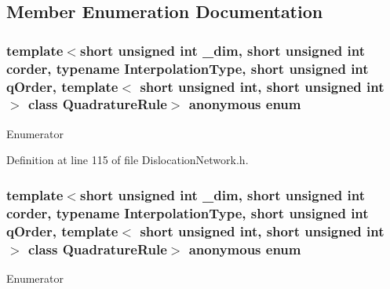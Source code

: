 \subsection{Member Enumeration Documentation}
\hypertarget{classmodel_1_1_dislocation_network_acc72ad5cadfe616bf9a84a64c77a4194}{}\subsubsection[{anonymous enum}]{\setlength{\rightskip}{0pt plus 5cm}template$<$short unsigned int \+\_\+dim, short unsigned int corder, typename Interpolation\+Type, short unsigned int q\+Order, template$<$ short unsigned int, short unsigned int $>$ class Quadrature\+Rule$>$ anonymous enum}\label{classmodel_1_1_dislocation_network_acc72ad5cadfe616bf9a84a64c77a4194}
\begin{Desc}
\item[Enumerator]\par
\begin{description}
\item[{\em 
\hypertarget{classmodel_1_1_dislocation_network_acc72ad5cadfe616bf9a84a64c77a4194aa094f91064b6826bd0d38c0a82dd5196}{}dim\label{classmodel_1_1_dislocation_network_acc72ad5cadfe616bf9a84a64c77a4194aa094f91064b6826bd0d38c0a82dd5196}
}]\end{description}
\end{Desc}


Definition at line 115 of file Dislocation\+Network.\+h.

\hypertarget{classmodel_1_1_dislocation_network_aaca8a960ed677d30699d7473fa964b40}{}\subsubsection[{anonymous enum}]{\setlength{\rightskip}{0pt plus 5cm}template$<$short unsigned int \+\_\+dim, short unsigned int corder, typename Interpolation\+Type, short unsigned int q\+Order, template$<$ short unsigned int, short unsigned int $>$ class Quadrature\+Rule$>$ anonymous enum}\label{classmodel_1_1_dislocation_network_aaca8a960ed677d30699d7473fa964b40}
\begin{Desc}
\item[Enumerator]\par
\begin{description}
\item[{\em 
\hypertarget{classmodel_1_1_dislocation_network_aaca8a960ed677d30699d7473fa964b40a9d384aadc7031c7c9ca7149f91e563cb}{}Ndof\+Xnode\label{classmodel_1_1_dislocation_network_aaca8a960ed677d30699d7473fa964b40a9d384aadc7031c7c9ca7149f91e563cb}
}]\end{description}
\end{Desc}


